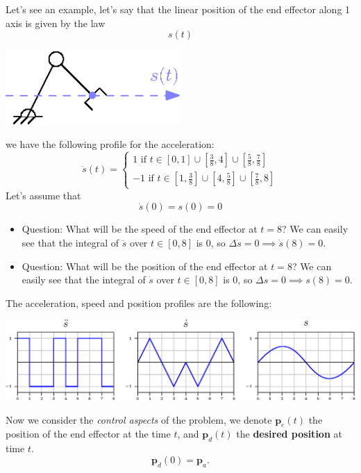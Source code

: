 \documentclass[10pt, letterpaper]{report}
\begin{document}
Let's see an example, let's say that the linear position of the end effector along 1 axis is given by the law\begin{equation}
    s(t)
\end{equation}\begin{center}
    \includegraphics[width=0.5\textwidth ]{images/lin_pos.eps} 
\end{center}
we have the following profile for the acceleration:
\begin{equation}
    \ddot s(t)=\begin{cases}
        1\text{ if }t\in[0,1]\cup [\frac{3}{8},4]\cup [\frac{5}{8},\frac{7}{8}]\\
        -1\text{ if }t\in[1,\frac{3}{8}]\cup [4,\frac{5}{8}]\cup [\frac{7}{8},8]
    \end{cases}
\end{equation}
Let's assume that\begin{equation}
    \dot s(0)=s(0)=0
\end{equation}
\begin{itemize}
    \item Question: What will be the speed of the end effector at $t=8$? We can easily see that the integral of $\ddot s$ over $t\in [0,8]$ is 0, so $\Delta\dot s =0\implies \dot s(8)=0$.
    \item Question: What will be the position of the end effector at $t=8$? We can easily see that the integral of $\dot s$ over $t\in [0,8]$ is 0, so $\Delta s =0\implies  s(8)=0$.
\end{itemize}
The acceleration, speed and position profiles are the following:\begin{center}
    \includegraphics[width=1\textwidth ]{images/profiles.eps} 
\end{center}
Now we consider the \textit{control aspects} of the problem, we denote $\mathbf p_e(t)$ the position of the end effector at the time $t$, and $\mathbf p_d(t)$ the \textbf{desired position} at time $t$.\begin{equation}
    \mathbf p_d(0)=\mathbf p_a.
\end{equation}
\end{document}
